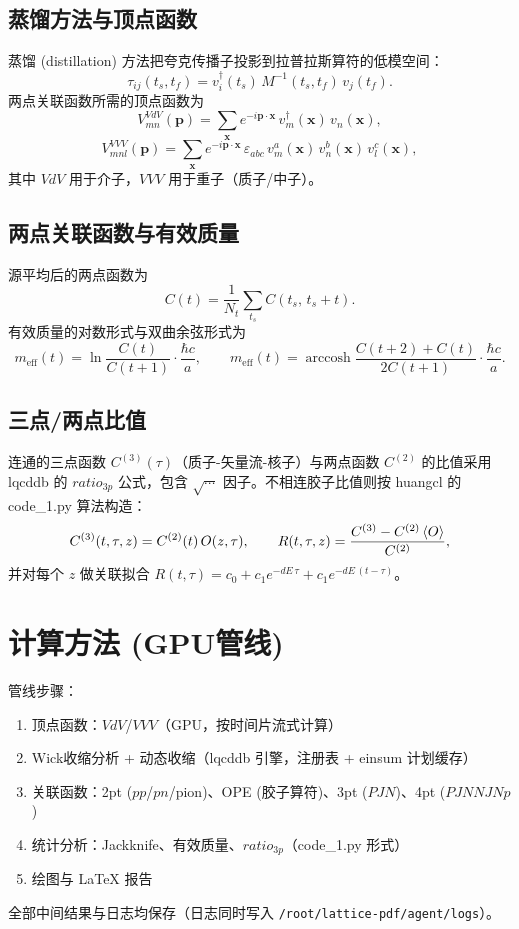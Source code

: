 \documentclass[11pt,a4paper]{article}
\newcommand{\meff}{m_{\mathrm{eff}}}
\newcommand{\Nt}{N_t}
\begin{document}
\subsection{蒸馏方法与顶点函数}
蒸馏 (distillation) 方法把夸克传播子投影到拉普拉斯算符的低模空间：
\[ \tau_{ij}(t_s,t_f) = v^\dagger_i(t_s)\, M^{-1}(t_s,t_f)\, v_j(t_f). \]
两点关联函数所需的顶点函数为
\begin{equation}
V^{VdV}_{mn}(\mathbf{p}) = \sum_{\mathbf{x}} e^{-i\mathbf{p}\cdot\mathbf{x}}\,
    v^\dagger_m(\mathbf{x})\, v_n(\mathbf{x}),
\label{eq:VdV}
\end{equation}
\begin{equation}
V^{VVV}_{m n l}(\mathbf{p}) = \sum_{\mathbf{x}} e^{-i\mathbf{p}\cdot\mathbf{x}}\,
    \varepsilon_{abc}\, v^a_m(\mathbf{x})\, v^b_n(\mathbf{x})\, v^c_l(\mathbf{x}),
\label{eq:VVV}
\end{equation}
其中 $VdV$ 用于介子，$VVV$ 用于重子（质子/中子）。

\subsection{两点关联函数与有效质量}
源平均后的两点函数为
\[ C(t) = \frac{1}{\Nt}\sum_{t_s} C(t_s,\, t_s + t). \]
有效质量的对数形式与双曲余弦形式为
\begin{equation}
\meff(t) = \ln\frac{C(t)}{C(t+1)}\cdot\frac{\hbar c}{a}, \qquad
\meff(t) = \operatorname{arccosh}\frac{C(t+2)+C(t)}{2C(t+1)}\cdot\frac{\hbar c}{a}.
\label{eq:meff}
\end{equation}

\subsection{三点/两点比值}
连通的三点函数 $C^{(3)}(\tau)$（质子-矢量流-核子）与两点函数 $C^{(2)}$ 的比值采用
lqcddb 的 $ratio_{3p}$ 公式，包含 $\sqrt{\cdots}$ 因子。不相连胶子比值则按
huangcl 的 code\_1.py 算法构造：
\begin{equation}
C^{(3)}(t, \tau, z) = C^{(2)}(t)\, O(z,\tau),
\qquad R(t,\tau,z) = \frac{C^{(3)} - C^{(2)}\braket{O}}{C^{(2)}},
\end{equation}
并对每个 $z$ 做关联拟合 $R(t,\tau) = c_0 + c_1 e^{-dE\,\tau} + c_1 e^{-dE\,(t-\tau)}$。

\section{计算方法 (GPU管线)}
管线步骤：
\begin{enumerate}
    \item 顶点函数：$VdV$/$VVV$（GPU，按时间片流式计算）
    \item Wick收缩分析 + 动态收缩（lqcddb 引擎，注册表 + einsum 计划缓存）
    \item 关联函数：2pt ($pp$/$pn$/pion)、OPE (胶子算符)、3pt ($PJN$)、4pt ($PJNNJNp$)
    \item 统计分析：Jackknife、有效质量、$ratio_{3p}$（code\_1.py 形式）
    \item 绘图与 LaTeX 报告
\end{enumerate}
全部中间结果与日志均保存（日志同时写入 \texttt{/root/lattice-pdf/agent/logs}）。
\end{document}
